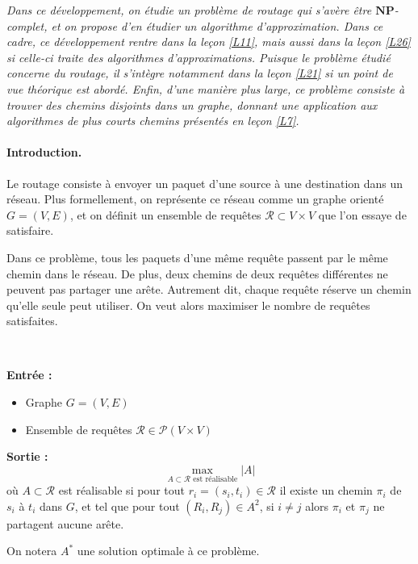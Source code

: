 
\textit{
Dans ce développement, on étudie un problème de routage qui s'avère être $\mathbf{NP}$-complet, et on propose d'en étudier un algorithme d'approximation. Dans ce cadre, ce développement rentre dans la leçon \ref{L11}, mais aussi dans la leçon \ref{L26} si celle-ci traite des algorithmes d'approximations. 
Puisque le problème étudié concerne du routage, il s'intègre notamment dans la leçon \ref{L21} si un point de vue théorique est abordé.\newline
Enfin, d'une manière plus large, ce problème consiste à trouver des chemins disjoints dans un graphe, donnant une application aux algorithmes de plus courts chemins présentés en leçon \ref{L7}.
}

\paragraph{Introduction.} Le routage consiste à envoyer un paquet d'une source à une destination dans un réseau. Plus formellement, on représente ce réseau comme un graphe orienté $G=(V,E)$, et on définit un ensemble de requêtes $\mathcal{R}\subset V\times V$ que l'on essaye de satisfaire.

Dans ce problème, tous les paquets d'une même requête passent par le même chemin dans le réseau. De plus, deux chemins de deux requêtes différentes ne peuvent pas partager une arête. Autrement dit, chaque requête réserve un chemin qu'elle seule peut utiliser. On veut alors maximiser le nombre de requêtes satisfaites.


\begin{definition}~

\noindent \textbf{Entrée :}
\begin{itemize}
\item Graphe $G=(V,E)$
\item Ensemble de requêtes $\mathcal{R} \in \mathcal{P}(V \times V)$
\end{itemize}
\noindent \textbf{Sortie :}
$$
\underset{\mbox{$A \subset \mathcal{R}$ est réalisable}}{\max} |A|
$$
où $A \subset \mathcal{R}$ est réalisable si pour tout $r_i=(s_i,t_i)\in \mathcal{R}$ il existe un chemin $\pi_i$ de $s_i$ à $t_i$ dans $G$, et tel que pour tout $(R_i,R_j) \in A^2$, si $i\neq j$ alors $\pi_i$ et $\pi_j$ ne partagent aucune arête. 

On notera $A^*$ une solution optimale à ce problème.
\end{definition}

